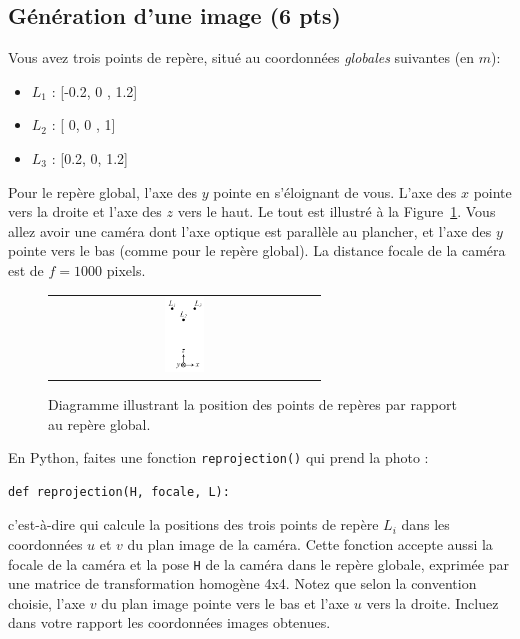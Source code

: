 \documentclass[12pt]{article}
\begin{document}
\subsection{Génération d'une image (6 pts)}
Vous avez trois points de repère, situé au coordonnées \emph{globales} suivantes (en $m$):
\begin{itemize}
\item $L_1$ : [-0.2, 0 , 1.2]
\item $L_2$ : [ 0, \hspace{0.08in} 0   , 1]
\item $L_3$ : [0.2, \hspace{0.03in} 0, 1.2]
\end{itemize}
Pour le repère global, l'axe des $y$ pointe en s'éloignant de vous. L'axe des $x$ pointe vers la droite et l'axe des $z$ vers le haut. Le tout est illustré à la Figure~\ref{DiagLocalisation}. Vous allez avoir une caméra dont l'axe optique est parallèle au plancher, et l'axe des $y$ pointe vers le bas (comme pour le repère global). La distance focale de la caméra est de $f=1000$ pixels.

\begin{figure}[ht]
 \begin{center}
  \begin{tabular}{c}
    \includegraphics[width=0.15\textwidth]{LocalisationCamera.png} 
  \end{tabular}
 \end{center}
\vspace{-0.3in}
 \caption{Diagramme illustrant la position des points de repères par rapport au repère global.}
 \label{DiagLocalisation}
\end{figure}

En Python, faites une fonction \texttt{reprojection()} qui prend la photo :
\vspace{-0.05in}
\begin{verbatim}
def reprojection(H, focale, L):
\end{verbatim}
\vspace{-0.05in}
c'est-à-dire qui calcule la positions des trois points de repère $L_i$ dans les coordonnées $u$ et $v$ du plan image de la caméra. Cette fonction accepte aussi la focale de la caméra et la pose \texttt{H} de la caméra dans le repère globale, exprimée par une matrice de transformation homogène 4x4.
Notez que selon la convention choisie, l'axe $v$ du plan image pointe vers le bas et l'axe $u$ vers la droite. Incluez dans votre rapport les coordonnées images obtenues.
\end{document}

